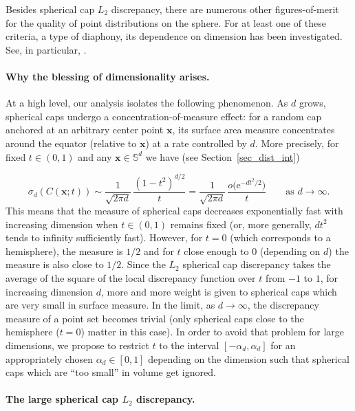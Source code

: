 \documentclass[12pt]{article}
\begin{document}
Besides spherical cap $L_2$ discrepancy, there are numerous other figures-of-merit for the quality of point distributions on the sphere. For at least one of these criteria, a type of diaphony, its dependence on dimension has been investigated. See, in particular, \cite[Section~3.4]{ChS13}.


\paragraph{Why the blessing of dimensionality arises.}
At a high level, our analysis isolates the following phenomenon. As $d$ grows, spherical caps undergo a concentration-of-measure effect: for a random cap anchored at an arbitrary center point $\bm{x}$, its surface area measure concentrates around the equator (relative to $\bm{x}$) at a rate controlled by $d$. More precisely, for fixed $t \in (0,1)$ and any $\bm{x} \in \mathbb{S}^d$ we have (see Section~\ref{sec_dist_int})

\begin{equation}\label{asym:Cxt}
\sigma_d(C(\bm{x}; t)) \sim \frac{1}{\sqrt{2\pi d}} \, \frac{(1-t^2)^{d/2}}{t} = \frac{1}{\sqrt{2\pi d}} \, \frac{o\big( \mathrm{e}^{- d t^2 / 2} \big)}{t} \qquad \text{as $d \to \infty$.}
\end{equation}
This means that the measure of spherical caps decreases exponentially fast with increasing dimension when $t \in (0,1)$ remains fixed (or, more generally, $d t^2$ tends to infinity sufficiently fast). However, for $t = 0$ (which corresponds to a hemisphere), the measure is $1/2$ and for $t$ close enough to $0$ (depending on $d$) the measure is also close to $1/2$. Since the $L_2$ spherical cap discrepancy takes the average of the square of the local discrepancy function over $t$ from $-1$ to $1$, for increasing dimension $d$, more and more weight is given to spherical caps which are very small in surface measure. In the limit, as $d \to \infty$, the discrepancy measure of a point set becomes trivial (only spherical caps close to the hemisphere ($t=0$) matter in this case). In order to avoid that problem for large dimensions, we propose to restrict $t$ to the interval $[-\alpha_d, \alpha_d]$ for an appropriately chosen $\alpha_d \in [0,1]$ depending on the dimension such that spherical caps which are ``too small'' in volume get ignored. 

\paragraph{The large spherical cap $L_2$ discrepancy.}
\end{document}
